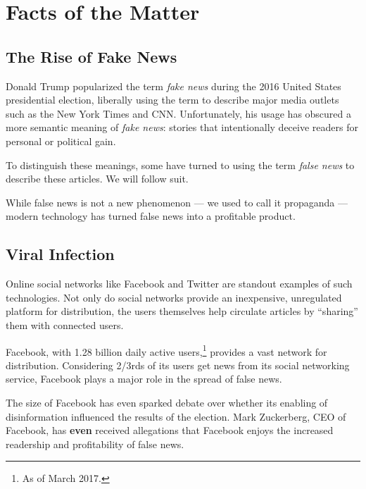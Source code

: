 
\section{Facts of the Matter}

\subsection{The Rise of Fake News}
\label{facts_rise}

\par Donald Trump popularized the term \emph{fake news} during the 2016 United States presidential election, liberally using the term to describe major media outlets such as the New York Times and CNN. \cite{telegraph_fn} Unfortunately, his usage has obscured a more semantic meaning of \emph{fake news}: stories that intentionally deceive readers for personal or political gain. \cite{npr_fn}

\par To distinguish these meanings, some have turned to using the term \emph{false news} to describe these articles. \cite{guardian_tips} We will follow suit.

\par While false news is not a new phenomenon --- we used to call it propaganda --- modern technology has turned false news into a profitable product. \cite{bbc_propaganda}

\subsection{Viral Infection}

\par Online social networks like Facebook and Twitter are standout examples of such technologies. Not only do social networks provide an inexpensive, unregulated platform for distribution, \cite{telegraph_fn} the users themselves help circulate articles by ``sharing'' them with connected users. \cite{telegraph_fn} 

\par Facebook, with 1.28 billion daily active users,\footnote{As of March 2017.} \cite{fb_newsroom} provides a vast network for distribution. Considering 2/3rds of its users get news from its social networking service, \cite{pew_news} Facebook plays a major role in the spread of false news.

\par The size of Facebook has even sparked debate over whether its enabling of disinformation influenced the results of the election. \cite{wp_russia,guardian_steps,tc_snowden} Mark Zuckerberg, CEO of Facebook, has \textbf{even} received allegations that Facebook enjoys the increased readership and profitability of false news. \cite{tc_responsibility}

